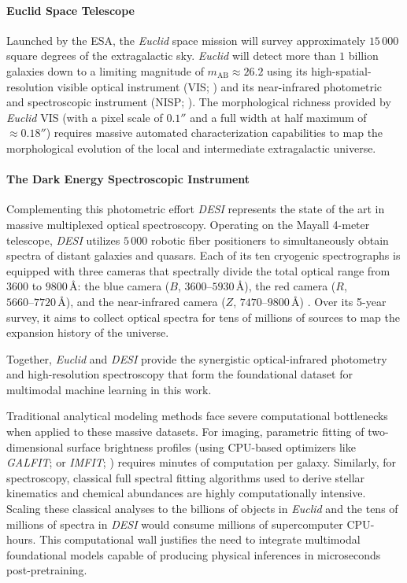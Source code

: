 \paragraph{Euclid Space Telescope} Launched by the \gls{ESA}, the \textit{Euclid} space mission \autocite{ar:mellier-2024} will survey approximately $15\,000$ square degrees of the extragalactic sky. \textit{Euclid} will detect more than $1$ billion galaxies down to a limiting magnitude of $m_{\text{AB}} \approx 26.2$ using its high-spatial-resolution visible optical instrument (VIS; \cite{ar:cropper-2024}) and its near-infrared photometric and spectroscopic instrument (NISP; \cite{ar:jahnke-2025}). The morphological richness provided by \textit{Euclid} VIS (with a pixel scale of $0.1''$ and a full width at half maximum of $\approx 0.18''$) requires massive automated characterization capabilities to map the morphological evolution of the local and intermediate extragalactic universe.

\paragraph{The Dark Energy Spectroscopic Instrument} Complementing this photometric effort \textit{\gls{DESI}} \autocite{ar:desi-early-release} represents the state of the art in massive multiplexed optical spectroscopy. Operating on the Mayall 4-meter telescope, \textit{\gls{DESI}} utilizes $5\,000$ robotic fiber positioners to simultaneously obtain spectra of distant galaxies and quasars. Each of its ten cryogenic spectrographs is equipped with three cameras that spectrally divide the total optical range from $3600$ to $9800\,\text{\AA{}}$: the blue camera ($B$, $3600\text{--}5930\,\text{\AA{}}$), the red camera ($R$, $5660\text{--}7720\,\text{\AA{}}$), and the near-infrared camera ($Z$, $7470\text{--}9800\,\text{\AA{}}$) \autocite{ar:abareshi-2022}. Over its 5-year survey, it aims to collect optical spectra for tens of millions of sources to map the expansion history of the universe. 

Together, \textit{Euclid} and \textit{DESI} provide the synergistic optical-infrared photometry and high-resolution spectroscopy that form the foundational dataset for multimodal machine learning in this work.

Traditional analytical modeling methods face severe computational bottlenecks when applied to these massive datasets. For imaging, parametric fitting of two-dimensional surface brightness profiles (using \gls{CPU}-based optimizers like \textit{GALFIT}; \cite{ar:peng-2002,ar:peng-2010} or \textit{IMFIT}; \cite{ar:erwin-2015}) requires minutes of computation per galaxy. Similarly, for spectroscopy, classical full spectral fitting algorithms used to derive stellar kinematics and chemical abundances \autocite{ar:cappellari-2004,ar:cappellari-2017} are highly computationally intensive. Scaling these classical analyses to the billions of objects in \textit{Euclid} and the tens of millions of spectra in \textit{DESI} would consume millions of supercomputer \gls{CPU}-hours. This computational wall justifies the need to integrate multimodal foundational models capable of producing physical inferences in microseconds post-pretraining.

